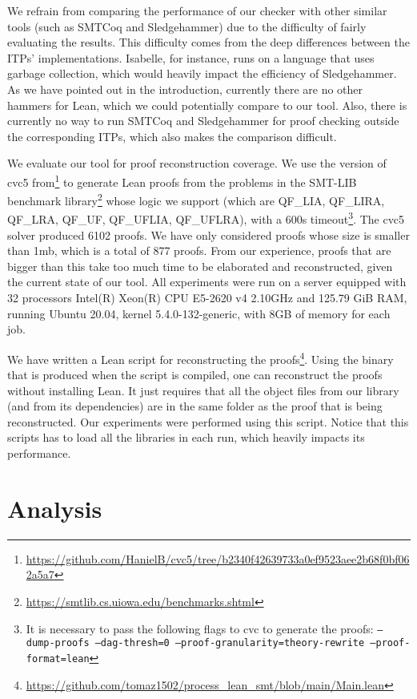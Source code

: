 We refrain from comparing the performance of our checker with other similar tools (such as
SMTCoq and Sledgehammer) due to the difficulty of fairly evaluating
the results. This difficulty comes from the deep differences between the ITPs'
implementations. Isabelle, for instance, runs on a language that uses
garbage collection, which would heavily impact the efficiency of
Sledgehammer.
As we have pointed out in the introduction, currently
there are no other hammers for Lean, which we could potentially compare
to our tool.
Also, there is currently no way to run SMTCoq and Sledgehammer for proof checking
outside the corresponding ITPs, which also makes the comparison difficult.

We evaluate our tool for proof reconstruction coverage.
We use the version of cvc5 from\footnote{\url{https://github.com/HanielB/cvc5/tree/b2340f42639733a0ef9523aee2b68f0bf062a5a7}}
to generate Lean proofs from the
problems in the SMT-LIB benchmark library\footnote{\url{https://smtlib.cs.uiowa.edu/benchmarks.shtml}} whose
logic we support (which are QF\_LIA, QF\_LIRA, QF\_LRA, QF\_UF, QF\_UFLIA, QF\_UFLRA), with a 600s timeout\footnote{It is necessary to pass the following flags to cvc to generate the
proofs: \texttt{--dump-proofs --dag-thresh=0 --proof-granularity=theory-rewrite --proof-format=lean}}.
The cvc5 solver produced 6102
proofs. We have only considered proofs whose size is smaller than
1mb, which is a total of 877 proofs. From our experience, proofs that are
bigger than this take too much time to be elaborated and reconstructed,
given the current state of our tool.
All experiments were run on a server
equipped with 32 processors Intel(R) Xeon(R) CPU E5-2620 v4 2.10GHz and
125.79 GiB RAM, running Ubuntu 20.04, kernel 5.4.0-132-generic, with 8GB of memory for each job.

We have written a Lean script for reconstructing the proofs\footnote{\url{https://github.com/tomaz1502/process_lean_smt/blob/main/Main.lean}}. Using the binary that is produced when the script is compiled, one can reconstruct the proofs without installing Lean.
It just requires that all the object files from our library (and from its dependencies) are in the same folder as the proof that is being reconstructed.
Our experiments were performed using this script.
Notice that this scripts has to load all the libraries in each run, which heavily impacts its performance.

\section{Analysis}

